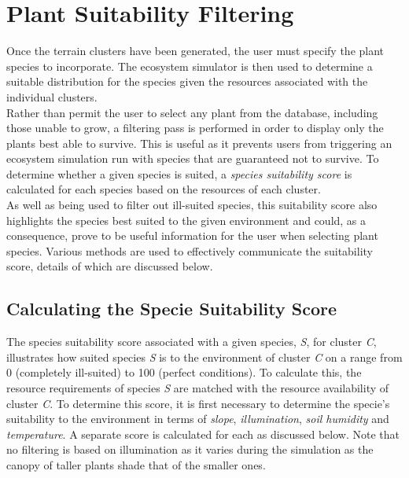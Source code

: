 \section{Plant Suitability Filtering} \label{sec:plant_suitability_filtering}

Once the terrain clusters have been generated, the user must specify the plant species to incorporate. The ecosystem simulator is then used to determine a suitable distribution for the species given the resources associated with the individual clusters.\\

Rather than permit the user to select any plant from the database, including those unable to grow, a filtering pass is performed in order to display only the plants best able to survive. This is useful as it prevents users from triggering an ecosystem simulation run with species that are guaranteed not to survive. To determine whether a given species is suited, a \textit{species suitability score} is calculated for each species based on the resources of each cluster. \\

As well as being used to filter out ill-suited species, this suitability score also highlights the species best suited to the given environment and could, as a consequence, prove to be useful information for the user when selecting plant species. Various methods are used to effectively communicate the suitability score, details of which are discussed below.

\subsection{Calculating the Specie Suitability Score}

The species suitability score associated with a given species, \textit{S}, for cluster \textit{C}, illustrates how suited species \textit{S} is to the environment of cluster \textit{C} on a range from 0 (completely ill-suited) to 100 (perfect conditions). To calculate this, the resource requirements of species \textit{S} are matched with the resource availability of cluster \textit{C}. To determine this score, it is first necessary to determine the specie's suitability to the environment in terms of \textit{slope}, \textit{illumination}, \textit{soil humidity} and \textit{temperature}. A separate score is calculated for each as discussed below. Note that no filtering is based on illumination as it varies during the simulation as the canopy of taller plants shade that of the smaller ones.\\

